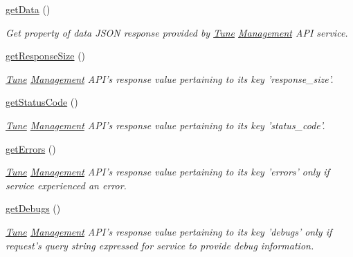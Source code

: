 \begin{DoxyCompactItemize}
\hyperlink{classTune_1_1Management_1_1Service_1_1Response_a125d385cf478fc9e628f6ffcecccbdc2}{get\-Data} ()
\begin{DoxyCompactList}\small\item\em Get property of data J\-S\-O\-N response provided by \hyperlink{namespaceTune}{Tune} \hyperlink{namespaceTune_1_1Management}{Management} A\-P\-I service. \end{DoxyCompactList}\item 
\hyperlink{classTune_1_1Management_1_1Service_1_1Response_a36c32070bf6a8a59a6d5572e76b553bc}{get\-Response\-Size} ()
\begin{DoxyCompactList}\small\item\em \hyperlink{namespaceTune}{Tune} \hyperlink{namespaceTune_1_1Management}{Management} A\-P\-I's response value pertaining to its key 'response\-\_\-size'. \end{DoxyCompactList}\item 
\hyperlink{classTune_1_1Management_1_1Service_1_1Response_a42ff92e006e731d8f061f853b706761f}{get\-Status\-Code} ()
\begin{DoxyCompactList}\small\item\em \hyperlink{namespaceTune}{Tune} \hyperlink{namespaceTune_1_1Management}{Management} A\-P\-I's response value pertaining to its key 'status\-\_\-code'. \end{DoxyCompactList}\item 
\hyperlink{classTune_1_1Management_1_1Service_1_1Response_abf438601e295fb863229e3b7baeced9b}{get\-Errors} ()
\begin{DoxyCompactList}\small\item\em \hyperlink{namespaceTune}{Tune} \hyperlink{namespaceTune_1_1Management}{Management} A\-P\-I's response value pertaining to its key 'errors' only if service experienced an error. \end{DoxyCompactList}\item 
\hyperlink{classTune_1_1Management_1_1Service_1_1Response_acf868473e9bd7c7a94d926848e881647}{get\-Debugs} ()
\begin{DoxyCompactList}\small\item\em \hyperlink{namespaceTune}{Tune} \hyperlink{namespaceTune_1_1Management}{Management} A\-P\-I's response value pertaining to its key 'debugs' only if request's query string expressed for service to provide debug information. \end{DoxyCompactList}\end{DoxyCompactItemize}


